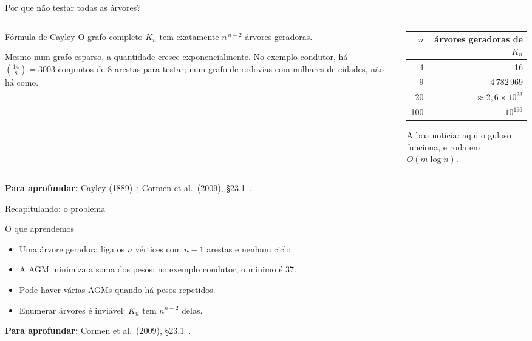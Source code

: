 \documentclass[aspectratio=169,xcolor=table]{beamer}
\newcommand{\fonte}[1]{%
  \vfill
  {\tiny\color{gray!55!black}\textbf{Para aprofundar:} #1\par}%
}
\begin{document}
\begin{frame}{Por que não testar todas as árvores?}
  \begin{columns}[c]
    \begin{column}{0.5\textwidth}
      \begin{block}{Fórmula de Cayley}
        \small O grafo completo $K_n$ tem exatamente $n^{\,n-2}$ árvores geradoras.
      \end{block}
      \scriptsize
      Mesmo num grafo esparso, a quantidade cresce exponencialmente. No exemplo condutor, há
      $\binom{14}{8} = 3003$ conjuntos de 8 arestas para testar; num grafo de rodovias com
      milhares de cidades, não há como.
    \end{column}
    \begin{column}{0.46\textwidth}
      \begin{center}
      \scriptsize
      \begin{tabular}{rr}
        \toprule
        $n$ & árvores geradoras de $K_n$ \\
        \midrule
        4 & 16 \\
        9 & 4\,782\,969 \\
        20 & $\approx 2{,}6 \times 10^{23}$ \\
        100 & $10^{196}$ \\
        \bottomrule
      \end{tabular}
      \end{center}
      \scriptsize
      A boa notícia: aqui o guloso funciona, e roda em $O(m \log n)$.
    \end{column}
  \end{columns}
  \fonte{Cayley (1889)~\cite{cayley1889theorem}; Cormen et al.\ (2009),
    \S 23.1~\cite{cormen2009introduction}.}
\end{frame}

\begin{frame}{Recapitulando: o problema}
  \begin{block}{O que aprendemos}
    \begin{itemize}
      \item Uma árvore geradora liga os $n$ vértices com $n - 1$ arestas e nenhum ciclo.
      \item A AGM minimiza a soma dos pesos; no exemplo condutor, o mínimo é 37.
      \item Pode haver várias AGMs quando há pesos repetidos.
      \item Enumerar árvores é inviável: $K_n$ tem $n^{n-2}$ delas.
    \end{itemize}
  \end{block}
  \fonte{Cormen et al.\ (2009), \S 23.1~\cite{cormen2009introduction}.}
\end{frame}
\end{document}
